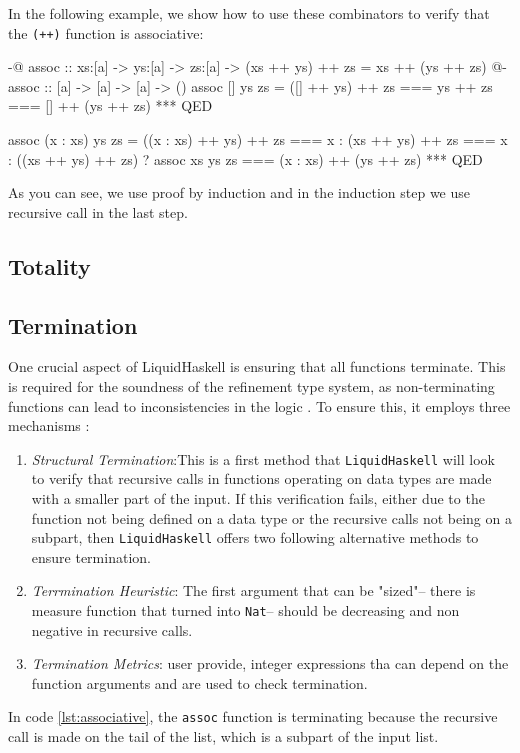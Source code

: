 In the following example, we show how to use these combinators to verify that the \texttt{(++)} function is associative:


\begin{code}[label=lst:associative]
	{-@ assoc :: xs:[a] -> ys:[a] -> zs:[a]
	-> { (xs ++ ys) ++ zs = xs ++ (ys ++ zs) } @-}
	assoc :: [a] -> [a] -> [a] -> ()
	assoc [] ys zs = ([] ++ ys) ++ zs
	=== ys ++ zs
	=== [] ++ (ys ++ zs)
	*** QED

	assoc (x : xs) ys zs = ((x : xs) ++ ys) ++ zs
	===  x : (xs ++ ys) ++ zs
	=== x : ((xs ++ ys) ++ zs) ? assoc xs ys zs
	=== (x : xs) ++ (ys ++ zs)
	*** QED
\end{code}
\vspace{1em}

As you can see, we use proof by induction and in the induction step we use recursive call in the last step.

\subsection{Totality}
\subsection{Termination}
One crucial aspect of LiquidHaskell is ensuring that all functions terminate.
This is required for the soundness of the refinement type system, as non-terminating functions can lead to inconsistencies in the logic \cite{niki_lecture_2024}.
To ensure this, it employs three mechanisms :
\begin{enumerate}
	\item \textit{Structural Termination}:This is a first method that \texttt{LiquidHaskell} will look to verify that recursive calls in functions operating on data types are made with a smaller part of the input.
	      If this verification fails, either due to the function not being defined on a data type or the recursive calls not being on a subpart, then \texttt{LiquidHaskell} offers two following alternative methods to ensure termination.
	\item \textit{Terrmination Heuristic}: The first argument that can be "sized"-- there is measure function that turned into \texttt{Nat}--
	      should be decreasing and non negative in recursive calls.

	\item \textit{Termination Metrics}: user provide, integer expressions tha can depend on the function arguments and are used to check termination.
\end{enumerate}
In code \ref{lst:associative}, the \texttt{assoc} function is terminating because the recursive call is made on the tail of the list, which is a subpart of the input list.

